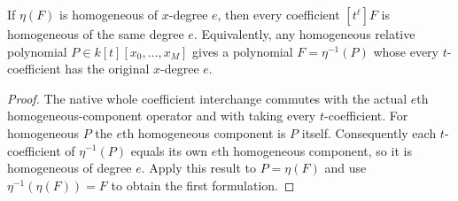 \begin{lemma}
\label{lem:c0n-relative-homogeneous-parameter-coefficients}
\leanok
If $\eta(F)$ is homogeneous of $x$-degree $e$, then every coefficient
$[t^\ell]F$ is homogeneous of the same degree $e$.
Equivalently, any homogeneous relative polynomial
$P\in k[t][x_0,\ldots,x_M]$ gives a polynomial $F=\eta^{-1}(P)$
whose every $t$-coefficient has the original $x$-degree $e$.
\end{lemma}
\begin{proof}
The native whole coefficient interchange commutes with the actual
$e$th homogeneous-component operator and with taking every $t$-coefficient.
For homogeneous $P$ the $e$th homogeneous component is $P$ itself.
Consequently each $t$-coefficient of $\eta^{-1}(P)$ equals its own
$e$th homogeneous component, so it is homogeneous of degree $e$.
Apply this result to $P=\eta(F)$ and use
$\eta^{-1}(\eta(F))=F$ to obtain the first formulation.
\end{proof}

